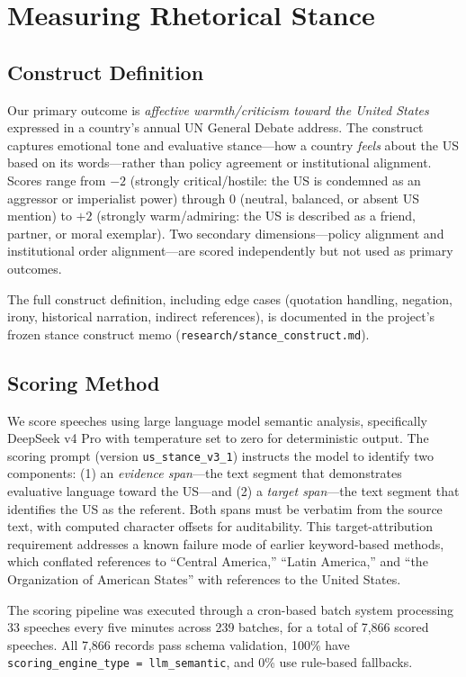 \section{Measuring Rhetorical Stance}\label{sec:measurement}

\subsection{Construct Definition}

Our primary outcome is \emph{affective warmth/criticism toward the United States} expressed in a country's annual UN General Debate address. The construct captures emotional tone and evaluative stance---how a country \emph{feels} about the US based on its words---rather than policy agreement or institutional alignment. Scores range from $-2$ (strongly critical/hostile: the US is condemned as an aggressor or imperialist power) through $0$ (neutral, balanced, or absent US mention) to $+2$ (strongly warm/admiring: the US is described as a friend, partner, or moral exemplar). Two secondary dimensions---policy alignment and institutional order alignment---are scored independently but not used as primary outcomes.

The full construct definition, including edge cases (quotation handling, negation, irony, historical narration, indirect references), is documented in the project's frozen stance construct memo (\texttt{research/stance\_construct.md}).

\subsection{Scoring Method}

We score speeches using large language model semantic analysis, specifically DeepSeek v4 Pro with temperature set to zero for deterministic output. The scoring prompt (version \texttt{us\_stance\_v3\_1}) instructs the model to identify two components: (1) an \emph{evidence span}---the text segment that demonstrates evaluative language toward the US---and (2) a \emph{target span}---the text segment that identifies the US as the referent. Both spans must be verbatim from the source text, with computed character offsets for auditability. This target-attribution requirement addresses a known failure mode of earlier keyword-based methods, which conflated references to ``Central America,'' ``Latin America,'' and ``the Organization of American States'' with references to the United States.

The scoring pipeline was executed through a cron-based batch system processing 33 speeches every five minutes across 239 batches, for a total of 7,866 scored speeches. All 7,866 records pass schema validation, 100\% have \texttt{scoring\_engine\_type = llm\_semantic}, and 0\% use rule-based fallbacks.

